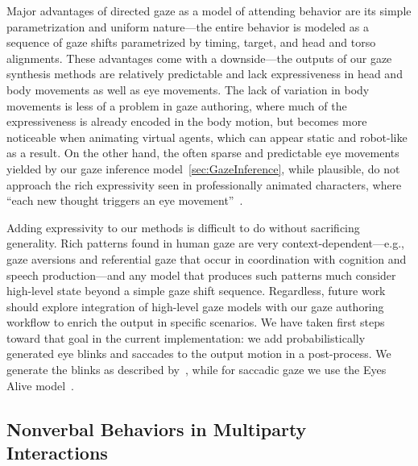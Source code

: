 Major advantages of directed gaze as a model of attending behavior are its simple parametrization and uniform nature---the entire behavior is modeled as a sequence of gaze shifts parametrized by timing, target, and head and torso alignments. These advantages come with a downside---the outputs of our gaze synthesis methods are relatively predictable and lack expressiveness in head and body movements as well as eye movements. The lack of variation in body movements is less of a problem in gaze authoring, where much of the expressiveness is already encoded in the body motion, but becomes more noticeable when animating virtual agents, which can appear static and robot-like as a result.
On the other hand, the often sparse and predictable eye movements yielded by our gaze inference model~\ref{sec:GazeInference}, while plausible, do not approach the rich expressivity seen in professionally animated characters, where ``each new thought triggers an eye movement''~\citep{maestri2001digital}.

Adding expressivity to our methods is difficult to do without sacrificing generality. Rich patterns found in human gaze are very context-dependent---e.g., gaze aversions and referential gaze that occur in coordination with cognition and speech production---and any model that produces such patterns much consider high-level state beyond a simple gaze shift sequence.
Regardless, future work should explore integration of high-level gaze models with our gaze authoring workflow to enrich the output in specific scenarios. We have taken first steps toward that goal in the current implementation: we add probabilistically generated eye blinks and saccades to the output motion in a post-process. We generate the blinks as described by~\citet{peters2010animating}, while for saccadic gaze we use the Eyes Alive model~\citep{lee2002eyes}.

\subsection{Nonverbal Behaviors in Multiparty Interactions}

